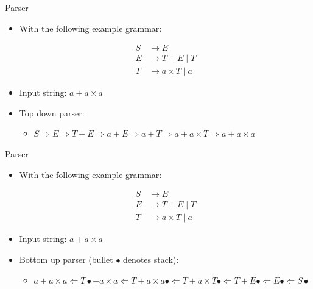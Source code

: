 
\begin{frame}{Parser}
\begin{itemize}
    \item With the following example grammar:
\begin{center}
\begin{align}
S &\rightarrow E \nonumber \\
E &\rightarrow T + E \; | \; T  \nonumber \\
T &\rightarrow a \times T \; | \; a \nonumber
\end{align}
\end{center}
    \item Input string: $a + a \times a$
    \item Top down parser:
    \begin{itemize}
        \item $ S \Rightarrow E \Rightarrow T + E \Rightarrow a + E \Rightarrow a + T \Rightarrow a + a \times T \Rightarrow a+ a \times a$
    \end{itemize}

\end{itemize}
\end{frame}


\begin{frame}{Parser}
\begin{itemize}
    \item With the following example grammar:
\begin{center}
\begin{align}
S &\rightarrow E \nonumber \\
E &\rightarrow T + E \; | \; T  \nonumber \\
T &\rightarrow a \times T \; | \; a \nonumber
\end{align}
\end{center}
    \item Input string: $a + a \times a$
    \item Bottom up parser (bullet $\bullet$ denotes stack):
    \begin{itemize}
        \item $a + a \times a \Leftarrow T \bullet + a \times a \Leftarrow T + a \times a \bullet \Leftarrow T + a \times T \bullet \Leftarrow T + E \bullet \Leftarrow E \bullet \Leftarrow S \bullet$
    \end{itemize}
\end{itemize}
\end{frame}

